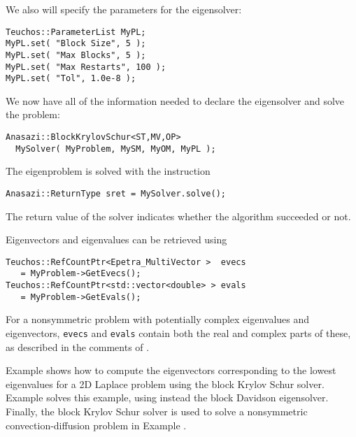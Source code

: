 We also will specify the parameters for the eigensolver:
\begin{verbatim}
Teuchos::ParameterList MyPL;
MyPL.set( "Block Size", 5 );
MyPL.set( "Max Blocks", 5 );
MyPL.set( "Max Restarts", 100 );
MyPL.set( "Tol", 1.0e-8 );
\end{verbatim}

We now have all of the information needed to declare the eigensolver
and solve the problem:
\begin{verbatim}
Anasazi::BlockKrylovSchur<ST,MV,OP> 
  MySolver( MyProblem, MySM, MyOM, MyPL );
\end{verbatim}
The eigenproblem is solved with the instruction
\begin{verbatim}
Anasazi::ReturnType sret = MySolver.solve();
\end{verbatim}
The return value of the solver indicates whether the algorithm
succeeded or not. 

Eigenvectors and eigenvalues can be retrieved using
\begin{verbatim}
Teuchos::RefCountPtr<Epetra_MultiVector >  evecs 
   = MyProblem->GetEvecs();
Teuchos::RefCountPtr<std::vector<double> > evals 
   = MyProblem->GetEvals();
\end{verbatim}
For a nonsymmetric problem with potentially complex eigenvalues and
eigenvectors, \verb!evecs! and \verb!evals! contain both the real and
complex parts of these, as described in the comments of
.

Example  shows how to compute the eigenvectors
corresponding to the lowest eigenvalues for a 2D Laplace problem using the block
Krylov Schur solver.  Example  solves this example,
using instead the block Davidson eigensolver.  Finally, the block Krylov Schur
solver is used to solve a nonsymmetric convection-diffusion problem in Example
.



